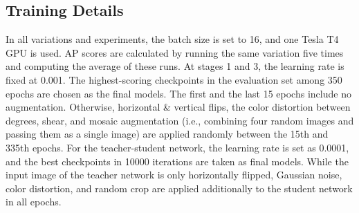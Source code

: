 \documentclass{article}
\begin{document}
\subsection{Training Details}

In all variations and experiments, the batch size is set to 16, and one Tesla T4 GPU is used. AP scores are calculated by running the same variation five times and computing the average of these runs. At stages 1 and 3, the learning rate is fixed at 0.001. The highest-scoring checkpoints in the evaluation set among 350 epochs are chosen as the final models. The first and the last 15 epochs include no augmentation. Otherwise, horizontal \& vertical flips, the color distortion between  degrees, shear, and mosaic augmentation (i.e., combining four random images and passing them as a single image) are applied randomly between the 15th and 335th epochs. For the teacher-student network, the learning rate is set as 0.0001, and the best checkpoints in 10000 iterations are taken as final models. While the input image of the teacher network is only horizontally flipped, Gaussian noise, color distortion, and random crop are applied additionally to the student network in all epochs.
\end{document}
